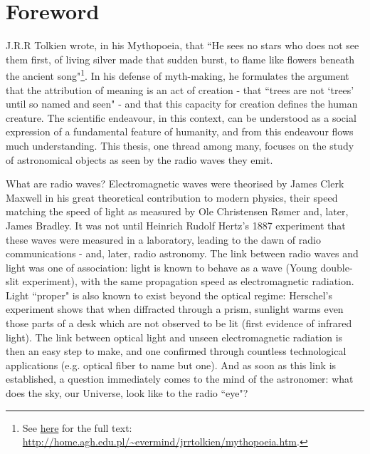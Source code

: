 \chapter*{Foreword}

\pg
J.R.R Tolkien wrote, in his Mythopoeia, that ``He sees no stars who does not see them first, of living silver made that sudden burst, to flame like flowers beneath the ancient song"\footnote{See \href{http://home.agh.edu.pl/~evermind/jrrtolkien/mythopoeia.htm}{here} for the full text: \url{http://home.agh.edu.pl/~evermind/jrrtolkien/mythopoeia.htm}.}. In his defense of myth-making, he formulates the argument that the attribution of meaning is an act of creation - that ``trees are not `trees' until so named and seen" - and that this capacity for creation defines the human creature. The scientific endeavour, in this context, can be understood as a social expression of a fundamental feature of humanity, and from this endeavour flows much understanding. This thesis, one thread among many, focuses on the study of astronomical objects as seen by the radio waves they emit.

\pg
What are radio waves? Electromagnetic waves were theorised by James Clerk Maxwell \citep{maxwell} in his great theoretical contribution to modern physics, their speed matching the speed of light as measured by Ole Christensen R\o mer and, later, James Bradley. It was not until Heinrich Rudolf Hertz's 1887 experiment that these waves were measured in a laboratory, leading to the dawn of radio communications - and, later, radio astronomy. The link between radio waves and light was one of association: light is known to behave as a wave (Young double-slit experiment), with the same propagation speed as electromagnetic radiation. Light ``proper" is also known to exist beyond the optical regime: Herschel's experiment shows that when diffracted through a prism, sunlight warms even those parts of a desk which are not observed to be lit (first evidence of infrared light). The link between optical light and unseen electromagnetic radiation is then an easy step to make, and one confirmed through countless technological applications (e.g. optical fiber to name but one). And as soon as this link is established, a question immediately comes to the mind of the astronomer: what does the sky, our Universe, look like to the radio ``eye"?

